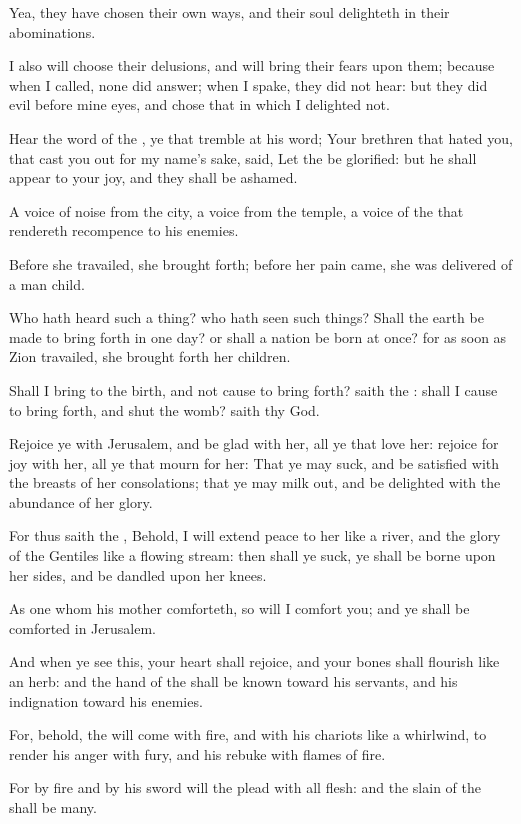 Yea, they have chosen their own ways, and their soul delighteth in their abominations.

\verse I also will choose their delusions, and will bring their fears upon them; because when I called, none did answer; when I spake, they did not hear: but they did evil before mine eyes, and chose that in which I delighted not.

\verse Hear the word of the \LORD, ye that tremble at his word; Your brethren that hated you, that cast you out for my name's sake, said, Let the \LORD be glorified: but he shall appear to your joy, and they shall be ashamed.

\verse A voice of noise from the city, a voice from the temple, a voice of the \LORD that rendereth recompence to his enemies.

\verse Before she travailed, she brought forth; before her pain came, she was delivered of a man child.

\verse Who hath heard such a thing? who hath seen such things? Shall the earth be made to bring forth in one day? or shall a nation be born at once?  for as soon as Zion travailed, she brought forth her children.

\verse Shall I bring to the birth, and not cause to bring forth? saith the \LORD: shall I cause to bring forth, and shut the womb? saith thy God.

\verse Rejoice ye with Jerusalem, and be glad with her, all ye that love her: rejoice for joy with her, all ye that mourn for her: \verse That ye may suck, and be satisfied with the breasts of her consolations; that ye may milk out, and be delighted with the abundance of her glory.

\verse For thus saith the \LORD, Behold, I will extend peace to her like a river, and the glory of the Gentiles like a flowing stream: then shall ye suck, ye shall be borne upon her sides, and be dandled upon her knees.

\verse As one whom his mother comforteth, so will I comfort you; and ye shall be comforted in Jerusalem.

\verse And when ye see this, your heart shall rejoice, and your bones shall flourish like an herb: and the hand of the \LORD shall be known toward his servants, and his indignation toward his enemies.

\verse For, behold, the \LORD will come with fire, and with his chariots like a whirlwind, to render his anger with fury, and his rebuke with flames of fire.

\verse For by fire and by his sword will the \LORD plead with all flesh: and the slain of the \LORD shall be many.

